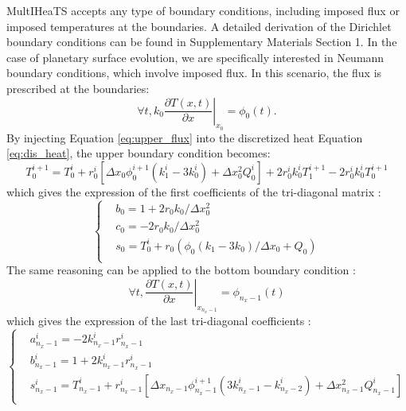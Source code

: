 \documentclass[sn-vancouver, Numbered]{sn-jnl}
\begin{document}
MultIHeaTS accepts any type of boundary conditions, including imposed flux or imposed temperatures at the boundaries. A detailed derivation of the Dirichlet boundary conditions can be found in Supplementary Materials Section 1. In the case of planetary surface evolution, we are specifically interested in Neumann boundary conditions, which involve imposed flux. 
In this scenario, the flux is prescribed at the boundaries:
\begin{equation}
    \forall t, k_0 \left. \dfrac{\partial T(x, t)}{\partial x}\right|_{x_0} = \phi_0(t).
    \label{eq:upper_flux}
\end{equation}
By injecting Equation \ref{eq:upper_flux} into the discretized heat Equation \ref{eq:dis_heat}, the upper boundary condition becomes:
\begin{equation}
    T_0^{i+1} = T_0^i + r_0^i \left[ \Delta x_{0} \phi_0^{i+1} \left(k_{1}^i - 3k_{0}^i\right) + \Delta x^2_0 Q_0^i \right]
      +  2 r_0^i k_0^i T_{1}^{i+1} - 2 r_0^i k_0^i  T_{0}^{i+1}
\end{equation}
which gives the expression of the first coefficients of the tri-diagonal matrix :
\begin{equation}
    \begin{cases}
        &b_0 = 1 + 2 r_0 k_0 / \Delta x_0^2  \\
        &c_0 = - 2 r_0 k_0   / \Delta x_0^2 \\
        &s_0 =  T_0^i + r_0 \left( \phi_0 \left(k_{1} - 3k_{0} \right)/\Delta x_0 +  Q_0 \right) \\
    \end{cases}   
    \label{eq:coeff_up}
\end{equation}
The same reasoning can be applied to the bottom boundary condition :
\begin{equation}
    \forall t, \left. \dfrac{\partial T(x, t)}{\partial x}\right|_{x_{n_x-1}} = \phi_{n_x-1}(t) 
\end{equation}
which gives the expression of the last tri-diagonal coefficients :
\begin{equation}
    \begin{cases}
        &a_{n_x-1}^i = - 2k_{n_x-1}^i r_{n_x-1}^i  \\
        &b_{n_x-1}^i = 1 +  2k_{n_x-1}^i r_{n_x-1}^i  \\
        &s_{n_x-1}^i =T_{n_x-1}^i + r_{n_x-1}^i \left[  \Delta x_{n_x-1} \phi_{n_x-1}^{i+1} \left( 3 k_{n_x-1}^i - k_{n_x-2}^i\right)  +  \Delta x^2_{n_x-1} Q_{n_x-1}^i\right] \\
        
    \end{cases}   
\end{equation}
\end{document}
